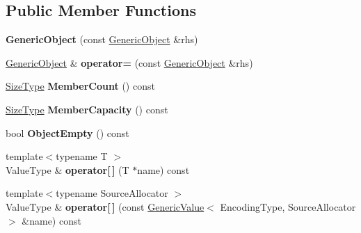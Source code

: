 \subsection*{Public Member Functions}
\begin{DoxyCompactItemize}
\item 
{\bfseries Generic\+Object} (const \hyperlink{classGenericObject}{Generic\+Object} \&rhs)\hypertarget{classGenericObject_a10173c42d0e8a71ca0e3ae75d800887a}{}\label{classGenericObject_a10173c42d0e8a71ca0e3ae75d800887a}

\item 
\hyperlink{classGenericObject}{Generic\+Object} \& {\bfseries operator=} (const \hyperlink{classGenericObject}{Generic\+Object} \&rhs)\hypertarget{classGenericObject_af8984f76d6f3b13039c6d3b8e217f747}{}\label{classGenericObject_af8984f76d6f3b13039c6d3b8e217f747}

\item 
\hyperlink{rapidjson_8h_a5ed6e6e67250fadbd041127e6386dcb5}{Size\+Type} {\bfseries Member\+Count} () const \hypertarget{classGenericObject_ab3772740b811ed417924cebdace1d190}{}\label{classGenericObject_ab3772740b811ed417924cebdace1d190}

\item 
\hyperlink{rapidjson_8h_a5ed6e6e67250fadbd041127e6386dcb5}{Size\+Type} {\bfseries Member\+Capacity} () const \hypertarget{classGenericObject_a3aea2ee68b9ff649fee0b9a8c375a34a}{}\label{classGenericObject_a3aea2ee68b9ff649fee0b9a8c375a34a}

\item 
bool {\bfseries Object\+Empty} () const \hypertarget{classGenericObject_a410e5dfd7fa047852ecb4b719a74f842}{}\label{classGenericObject_a410e5dfd7fa047852ecb4b719a74f842}

\item 
{\footnotesize template$<$typename T $>$ }\\Value\+Type \& {\bfseries operator\mbox{[}$\,$\mbox{]}} (T $\ast$name) const \hypertarget{classGenericObject_af3db47f1615353d0c5ce974c2fbe7885}{}\label{classGenericObject_af3db47f1615353d0c5ce974c2fbe7885}

\item 
{\footnotesize template$<$typename Source\+Allocator $>$ }\\Value\+Type \& {\bfseries operator\mbox{[}$\,$\mbox{]}} (const \hyperlink{classGenericValue}{Generic\+Value}$<$ Encoding\+Type, Source\+Allocator $>$ \&name) const \hypertarget{classGenericObject_aac0937f20bfdc94380641bb02cefbf98}{}\label{classGenericObject_aac0937f20bfdc94380641bb02cefbf98}


\end{DoxyCompactItemize}
